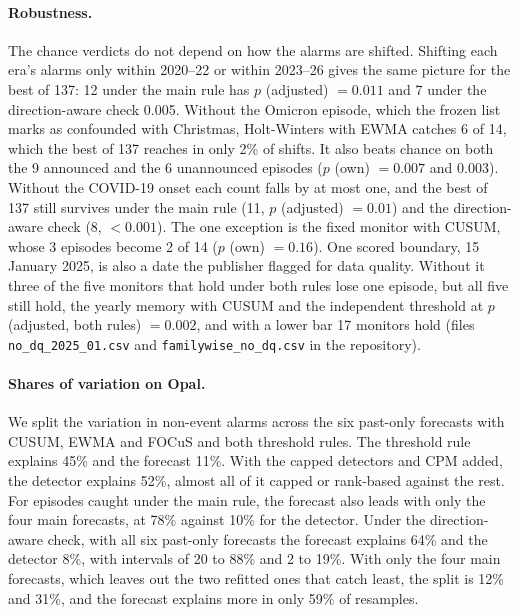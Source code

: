 \paragraph{Robustness.} The chance verdicts do not depend on how the alarms are shifted. Shifting each era's alarms only within 2020--22 or within 2023--26 gives the same picture for the best of 137: 12 under the main rule has $p$ (adjusted) $=0.011$ and 7 under the direction-aware check 0.005. Without the Omicron episode, which the frozen list marks as confounded with Christmas, Holt-Winters with EWMA catches 6 of 14, which the best of 137 reaches in only 2\% of shifts. It also beats chance on both the 9 announced and the 6 unannounced episodes ($p$ (own) $=0.007$ and $0.003$). Without the COVID-19 onset each count falls by at most one, and the best of 137 still survives under the main rule (11, $p$ (adjusted) $=0.01$) and the direction-aware check (8, $<0.001$). The one exception is the fixed monitor with CUSUM, whose 3 episodes become 2 of 14 ($p$ (own) $=0.16$). One scored boundary, 15 January 2025, is also a date the publisher flagged for data quality. Without it three of the five monitors that hold under both rules lose one episode, but all five still hold, the yearly memory with CUSUM and the independent threshold at $p$ (adjusted, both rules) $=0.002$, and with a lower bar 17 monitors hold (files \texttt{no\_dq\_2025\_01.csv} and \texttt{familywise\_no\_dq.csv} in the repository).

\paragraph{Shares of variation on Opal.} We split the variation in non-event alarms across the six past-only forecasts with CUSUM, EWMA and FOCuS and both threshold rules. The threshold rule explains 45\% and the forecast 11\%. With the capped detectors and CPM added, the detector explains 52\%, almost all of it capped or rank-based against the rest. For episodes caught under the main rule, the forecast also leads with only the four main forecasts, at 78\% against 10\% for the detector. Under the direction-aware check, with all six past-only forecasts the forecast explains 64\% and the detector 8\%, with intervals of 20 to 88\% and 2 to 19\%. With only the four main forecasts, which leaves out the two refitted ones that catch least, the split is 12\% and 31\%, and the forecast explains more in only 59\% of resamples.

\clearpage



